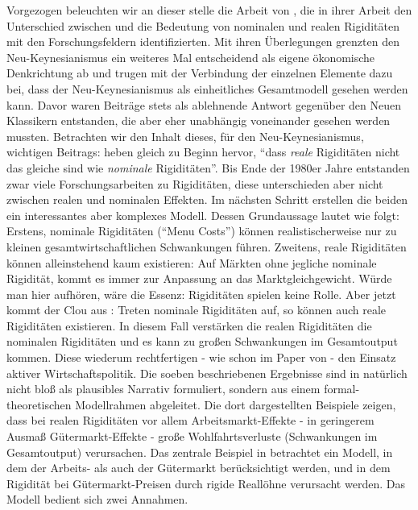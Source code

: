 Vorgezogen beleuchten wir an dieser stelle die Arbeit von \textcite{RomerDavid1990}, die in ihrer Arbeit den Unterschied zwischen und die Bedeutung von nominalen und realen Rigiditäten mit den Forschungsfeldern identifizierten. Mit ihren Überlegungen grenzten \textcite{RomerDavid1990} den Neu-Keynesianismus ein weiteres Mal entscheidend als eigene ökonomische Denkrichtung ab und trugen mit der Verbindung der einzelnen Elemente dazu bei, dass der Neu-Keynesianismus als einheitliches Gesamtmodell gesehen werden kann. Davor waren Beiträge stets als ablehnende Antwort gegenüber den Neuen Klassikern entstanden, die aber eher unabhängig voneinander gesehen werden mussten. Betrachten wir den Inhalt dieses, für den Neu-Keynesianismus, wichtigen Beitrags: \textcite[S. 183]{RomerDavid1990} heben gleich zu Beginn hervor, "`dass \textit{reale} Rigiditäten nicht das gleiche sind wie \textit{nominale} Rigiditäten"'. Bis Ende der 1980er Jahre entstanden zwar viele Forschungsarbeiten zu Rigiditäten, diese unterschieden aber nicht zwischen realen und nominalen Effekten. Im nächsten Schritt erstellen die beiden ein interessantes aber komplexes Modell. Dessen Grundaussage lautet wie folgt: Erstens, nominale Rigiditäten ("`Menu Costs"') können realistischerweise nur zu kleinen gesamtwirtschaftlichen Schwankungen führen. Zweitens, reale Rigiditäten können alleinstehend kaum existieren: Auf Märkten ohne jegliche nominale Rigidität, kommt es immer zur Anpassung an das Marktgleichgewicht. Würde man hier aufhören, wäre die Essenz: Rigiditäten spielen keine Rolle. Aber jetzt kommt der Clou aus \textcite{RomerDavid1990}: Treten nominale Rigiditäten auf, so können auch reale Rigiditäten existieren. In diesem Fall verstärken die realen Rigiditäten die nominalen Rigiditäten und es kann zu großen Schwankungen im Gesamtoutput kommen. Diese wiederum rechtfertigen - wie schon im Paper von \textcite{Akerlof1985} - den Einsatz aktiver Wirtschaftspolitik.
Die soeben beschriebenen Ergebnisse sind in \textcite{RomerDavid1990} natürlich nicht bloß als plausibles Narrativ formuliert, sondern aus einem formal-theoretischen Modellrahmen abgeleitet. Die dort dargestellten Beispiele zeigen, dass bei realen Rigiditäten vor allem Arbeitsmarkt-Effekte - in geringerem Ausmaß Gütermarkt-Effekte - große Wohlfahrtsverluste (Schwankungen im Gesamtoutput) verursachen. Das zentrale Beispiel in \textcite{RomerDavid1990} betrachtet ein Modell, in dem der Arbeits- als auch der Gütermarkt berücksichtigt werden, und in dem Rigidität bei Gütermarkt-Preisen durch rigide Reallöhne verursacht werden. Das Modell bedient sich zwei Annahmen. 

